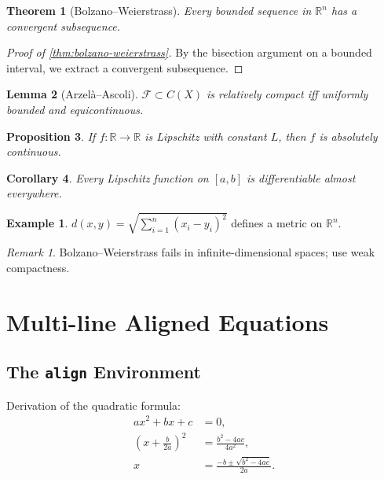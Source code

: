 \documentclass[
    language=english,
    doctype=article,
    institution=none,
    titlestyle=book,
]{../../omnilatex}
\theoremstyle{plain}
\newtheorem{theorem}{Theorem}[section]
\newtheorem{lemma}[theorem]{Lemma}
\newtheorem{proposition}[theorem]{Proposition}
\newtheorem{corollary}[theorem]{Corollary}
\theoremstyle{definition}
\newtheorem{example}{Example}[section]
\theoremstyle{remark}
\newtheorem{remark}{Remark}[section]
\begin{document}
\begin{theorem}[Bolzano--Weierstrass]\label{thm:bolzano-weierstrass}
Every bounded sequence in $\mathbb{R}^n$ has a convergent subsequence.
\end{theorem}

\begin{proof}[Proof of \autoref{thm:bolzano-weierstrass}]
By the bisection argument on a bounded interval, we extract a convergent subsequence.
\end{proof}

\begin{lemma}[Arzel\`{a}--Ascoli]\label{lem:arzela-ascoli}
$\mathcal{F} \subset C(X)$ is relatively compact iff uniformly bounded and equicontinuous.
\end{lemma}

\begin{proposition}\label{prop:lipschitz}
If $f\colon \mathbb{R} \to \mathbb{R}$ is Lipschitz with constant $L$, then $f$ is
absolutely continuous.
\end{proposition}

\begin{corollary}\label{cor:lipschitz}
Every Lipschitz function on $[a,b]$ is differentiable almost everywhere.
\end{corollary}

\begin{example}\label{ex:euclidean}
$d(x,y) = \sqrt{\sum_{i=1}^n (x_i - y_i)^2}$ defines a metric on $\mathbb{R}^n$.
\end{example}

\begin{remark}
Bolzano--Weierstrass fails in infinite-dimensional spaces; use weak compactness.
\end{remark}

\section{Multi-line Aligned Equations}
\label{sec:aligned-equations}

\subsection{The \texttt{align} Environment}

Derivation of the quadratic formula:
\begin{align}
    ax^2 + bx + c &= 0, \label{eq:quad-start}\\
    \left(x + \frac{b}{2a}\right)^2 &= \frac{b^2 - 4ac}{4a^2}, \label{eq:quad-square}\\
    x &= \frac{-b \pm \sqrt{b^2 - 4ac}}{2a}. \label{eq:quad-end}
\end{align}
\end{document}
